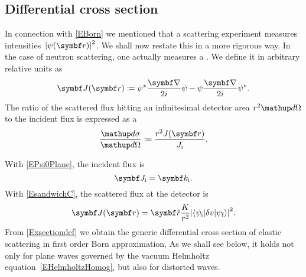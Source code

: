 %


\subsection{Differential cross section}\label{SdiffCross}

In connection with \cref{EBorn} we mentioned
that a scattering experiment measures intensities~${|\psi(\r)|}^2$.
We shall now restate this in a more rigorous way.
In the case of neutron scattering,
one actually measures a .
We define it in arbitrary relative units as
\begin{equation}\label{EdefJ}
  \v{J}(\r) \coloneqq  \psi^*\frac{\Nabla}{2i}\psi - \psi\frac{\Nabla}{2i}\psi^*.
\end{equation}
%
%
The ratio of the scattered flux hitting an infinitesimal detector area
$r^2\d\Omega$ to the incident flux is expressed as a
%
%
\begin{equation}\label{Exsectiondef}
  \frac{\d\sigma}{\d\Omega}
  \coloneqq  \frac{r^2 J(\r)}{J_\ti}.
\end{equation}
%
%

With \cref{EPsi0Plane}, the incident flux is
%
%
\begin{equation}\label{EJi}
  \v{J}_\ti = \k_\ti.
\end{equation}
With \cref{EsandwichC}, the scattered flux at the detector is
\begin{equation}\label{EJr}
  \v{J}(\r)
  = \v{\hat r}\frac{K}{r^2}
    {\left|\bra\psi_\ti|\delta v|\psi_\tf\ket\right|}^2.
\end{equation}
From \cref{Exsectiondef} we obtain
the generic differential cross section
of elastic scattering in first order Born approximation,
%
%
%
%
As we shall see below,
it holds not only for plane waves governed
by the vacuum Helmholtz equation~\cref{EHelmholtzHomog},
but also for distorted waves.
%

